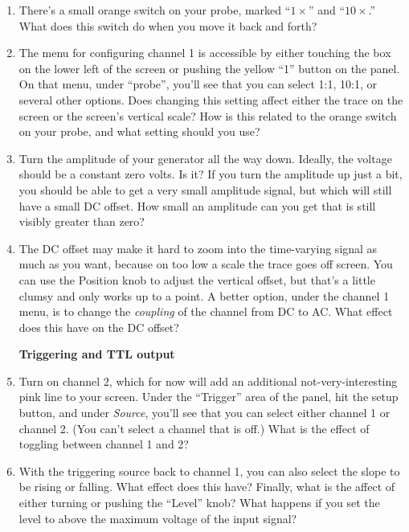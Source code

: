 \begin{enumerate}[wide]
\item There's a small orange switch on your probe, marked ``$1\times$'' and ``$10\times$.'' What does this switch do when you move it back and forth?

\item The menu for configuring channel 1 is accessible by either touching the box on the lower left of the screen or pushing the yellow ``1'' button on the panel.  On that menu, under ``probe'', you'll see that you can select 1:1, 10:1, or several other options.  Does changing this setting affect either the trace on the screen or the screen's vertical scale?  How is this related to the orange switch on your probe, and what setting should you use?

\item Turn the amplitude of your generator all the way down.  Ideally, the voltage should be a constant zero volts.  Is it? If you turn the amplitude up just a bit, you should be able to get a very small amplitude signal, but which will still have a small DC offset.  How small an amplitude can you get that is still visibly greater than zero?

\item The DC offset may make it hard to zoom into the time-varying signal as much as you want, because on too low a scale the trace goes off screen.  You can use the Position knob to adjust the vertical offset, but that's a little clumsy and only works up to a point.  A better option, under the channel 1 menu, is to change the \textit{coupling} of the channel from DC to AC.  What effect does this have on the DC offset?

\bigskip
\textbf{Triggering and TTL output}

\item Turn on channel 2, which for now will add an additional not-very-interesting pink line to your screen.  Under the ``Trigger'' area of the panel, hit the setup button, and under \textit{Source}, you'll see that you can select either channel 1 or channel 2.  (You can't select a channel that is off.)  What is the effect of toggling between channel 1 and 2?

\item With the triggering source back to channel 1, you can also select the slope to be rising or falling.  What effect does this have?  Finally, what is the affect of either turning or pushing the ``Level'' knob?  What happens if you set the level to above the maximum voltage of the input signal?


\end{enumerate}
